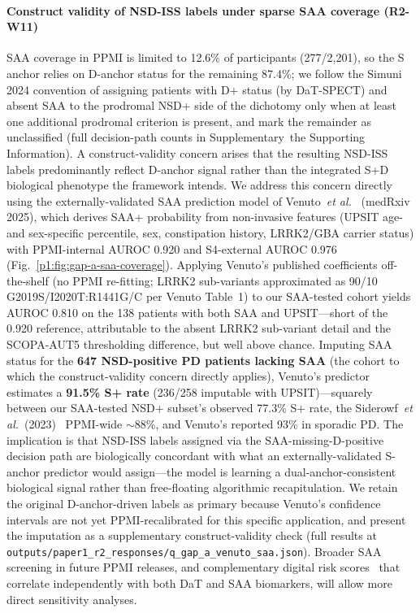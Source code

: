 \documentclass[10pt,letterpaper]{article}
\begin{document}
\paragraph*{Construct validity of NSD-ISS labels under sparse SAA coverage (R2-W11)} SAA coverage in PPMI is limited to 12.6\% of participants (277/2{,}201), so the S anchor relies on D-anchor status for the remaining 87.4\%; we follow the Simuni 2024 convention of assigning patients with D+ status (by DaT-SPECT) and absent SAA to the prodromal NSD+ side of the dichotomy only when at least one additional prodromal criterion is present, and mark the remainder as unclassified (full decision-path counts in Supplementary~the Supporting Information). A construct-validity concern arises that the resulting NSD-ISS labels predominantly reflect D-anchor signal rather than the integrated S+D biological phenotype the framework intends. We address this concern directly using the externally-validated SAA prediction model of Venuto~\textit{et al.}~\cite{venuto2025saa} (medRxiv 2025), which derives SAA+ probability from non-invasive features (UPSIT age- and sex-specific percentile, sex, constipation history, LRRK2/GBA carrier status) with PPMI-internal AUROC 0.920 and S4-external AUROC 0.976 (Fig.~\ref{p1:fig:gap-a-saa-coverage}). Applying Venuto's published coefficients off-the-shelf (no PPMI re-fitting; LRRK2 sub-variants approximated as 90/10 G2019S/I2020T:R1441G/C per Venuto Table~1) to our SAA-tested cohort yields AUROC 0.810 on the 138 patients with both SAA and UPSIT---short of the 0.920 reference, attributable to the absent LRRK2 sub-variant detail and the SCOPA-AUT5 thresholding difference, but well above chance. Imputing SAA status for the \textbf{647 NSD-positive PD patients lacking SAA} (the cohort to which the construct-validity concern directly applies), Venuto's predictor estimates a \textbf{91.5\% S+ rate} (236/258 imputable with UPSIT)---squarely between our SAA-tested NSD+ subset's observed 77.3\% S+ rate, the Siderowf~\textit{et al.}~(2023)~\cite{siderowf2023} PPMI-wide ${\sim}88\%$, and Venuto's reported 93\% in sporadic PD. The implication is that NSD-ISS labels assigned via the SAA-missing-D-positive decision path are biologically concordant with what an externally-validated S-anchor predictor would assign---the model is learning a dual-anchor-consistent biological signal rather than free-floating algorithmic recapitulation. We retain the original D-anchor-driven labels as primary because Venuto's confidence intervals are not yet PPMI-recalibrated for this specific application, and present the imputation as a supplementary construct-validity check (full results at \texttt{outputs/paper1\_r2\_responses/q\_gap\_a\_venuto\_saa.json}). Broader SAA screening in future PPMI releases, and complementary digital risk scores~\cite{schalkamp2025wearables} that correlate independently with both DaT and SAA biomarkers, will allow more direct sensitivity analyses.
\end{document}
